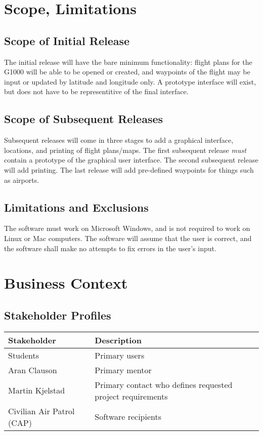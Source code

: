 \documentclass[12pt, letterpaper]{article}
\begin{document}
\section{Scope, Limitations}
\subsection{Scope of Initial Release}
The initial release will have the bare minimum functionality:
    flight plans for the G1000 will be able to be opened or created,
    and waypoints of the flight may be input or updated by latitude and longitude only.
A prototype interface will exist, but does not have to be representitive of the final interface.

\subsection{Scope of Subsequent Releases}
Subsequent releases will come in three stages to add a graphical interface, locations, and printing of flight plans/maps.
The first subsequent release \emph{must} contain a prototype of the graphical user interface.
The second subsequent release will add printing.
The last release will add pre-defined waypoints for things such as airports.

\subsection{Limitations and Exclusions}
The software must work on Microsoft Windows, and is not required to work on Linux or Mac computers.
The software will assume that the user is correct,
    and the software shall make no attempts to fix errors in the user's input.

\section{Business Context}
\subsection{Stakeholder Profiles}

\begin{tabular}{ |l|l| }
\hline
Stakeholder & Description \\ \hline \hline
Students & Primary users \\ \hline
Aran Clauson & Primary mentor \\ \hline
Martin Kjelstad & Primary contact who defines requested project requirements \\ \hline
Civilian Air Patrol (CAP) & Software recipients \\ \hline
\hline
\end{tabular}
\end{document}
